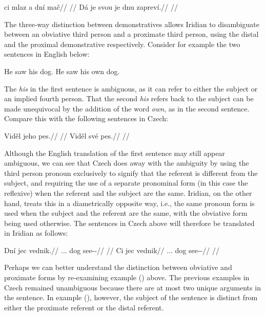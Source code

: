 \pex
\a{}
\begingl
\gla ci mlaz a dní mač//
\glft {}//
\endgl
\a{}
\begingl
\gla Dá je svou je dnu zapreví.//
\glft {}//
\endgl
\xe

The three-way distinction between demonstratives allows Iridian to disambiguate
between an obviative third person and a proximate third person,
using the distal and the proximal demonstrative respectively. Consider for
example the two sentences in English below:

\pex
\a He saw his dog.
\a He saw his own dog.\smallskip
\xe

The \emph{his} in the first sentence is ambiguous, as it can refer to either the
subject or an implied fourth person. That the second \emph{his} refers back to
the subject can be made unequivocal by the addition of the word \emph{own}, as
in the second sentence. Compare this with the following sentences in Czech:

\begin{multicols}{2}
  \pex
  \a
  \begingl
  \gla Viděl jeho pes.//
  \glft {}//
  \endgl
  \a \begingl
  \gla Viděl své pes.//
  \glft {}//
  \endgl
  \xe
\end{multicols}

Although the English translation of the first sentence may still appear
ambiguous, we can see that Czech does away with the ambiguity by using the third
person pronoun  exclusively to signify that the referent is different
from the subject, and requiring the use of a separate pronominal form (in this
case the reflexive) when the referent and the subject are the same. Iridian, on
the other hand, treats this in a diametrically opposite way, i.e., the same
pronoun form is used when the subject and the referent are the same, with the
obviative form being used otherwise. The sentences in Czech above will therefore
be translated in Iridian as follows:

\pex
\a
\begingl
\gla Dní jec vednik.//
\glb \Dem{}.\Dist{}.\Anim{}.\Gen{} dog see-\Pv{}-\Pf{}//
\glft {}//
\endgl
\a \begingl
\gla Ci jec vednik//
\glb \Dem{}.\Prox{}.\Anim{}.\Gen{} dog see-\Pv{}-\Pf{}//
\glft {}//
\endgl
\xe

Perhaps we can better understand the distinction between obviative and proximate
forms by re-examining example () above. The previous
examples in Czech remained unambiguous because there are at most two unique
arguments in the sentence. In example (), however, the
subject of the sentence is distinct from either the proximate referent or the
distal referent.

